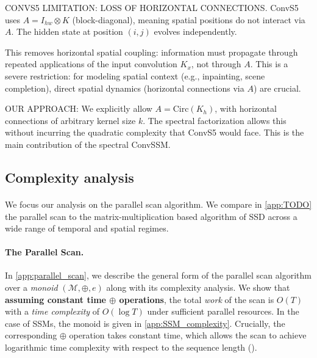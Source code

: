 \documentclass{article}
\begin{document}
\begin{thomasbox}
CONVS5 LIMITATION: LOSS OF HORIZONTAL CONNECTIONS. ConvS5 uses $A = I_{hw} \otimes K$ (block-diagonal), meaning spatial positions do not interact via $A$. The hidden state at position $(i, j)$ evolves independently.

This removes horizontal spatial coupling: information must propagate through repeated applications of the input convolution $K_x$, not through $A$. This is a severe restriction: for modeling spatial context (e.g., inpainting, scene completion), direct spatial dynamics (horizontal connections via $A$) are crucial.

OUR APPROACH: We explicitly allow $A = \mathrm{Circ}(K_h)$, with horizontal connections of arbitrary kernel size $k$. The spectral factorization allows this without incurring the quadratic complexity that ConvS5 would face. This is the main contribution of the spectral ConvSSM.
\end{thomasbox}

\subsection{Complexity analysis}
\label{sec:complexity_analysis}

\paragraph{} We focus our analysis on the parallel scan algorithm. We compare in \cref{app:TODO} the parallel scan to the matrix-multiplication based algorithm of SSD \citep{TODO} across a wide range of temporal and spatial regimes.

\paragraph{The Parallel Scan.} In \cref{app:parallel_scan}, we describe the general form of the parallel scan algorithm over a \emph{monoid} $(\mathcal{M}, \oplus, e)$ along with its complexity analysis. We show that \textbf{assuming constant time $\bm \oplus$ operations}, the total \emph{work} of the scan is $O(T)$ with a \emph{time complexity} of $O(\log T)$ under sufficient parallel resources. In the case of SSMs, the monoid is given in \cref{app:SSM_complexity}. Crucially, the corresponding $\oplus$ operation takes constant time, which allows the scan to achieve logarithmic time complexity with respect to the sequence length ().
\end{document}
